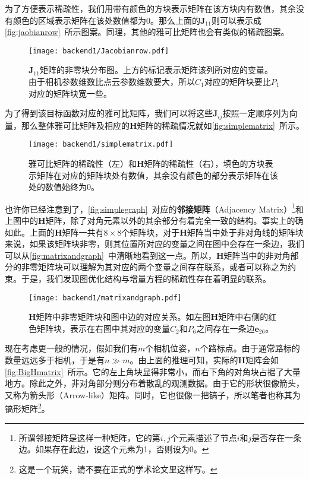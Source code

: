 为了方便表示稀疏性，我们用带有颜色的方块表示矩阵在该方块内有数值，其余没有颜色的区域表示矩阵在该处数值都为0。那么上面的$\bm{J}_{11}$则可以表示成\autoref{fig:jaobianrow}~所示图案。同理，其他的雅可比矩阵也会有类似的稀疏图案。

\begin{figure}[!t]
	\centering
	\texttt{[image: backend1/Jacobianrow.pdf]}
	\caption{$\bm{J}_{11}$矩阵的非零块分布图。上方的标记表示矩阵该列所对应的变量。由于相机参数维数比点云参数维数要大，所以$C_1$对应的矩阵块要比$P_1$对应的矩阵块宽一些。}
	\label{fig:jaobianrow}
\end{figure}

为了得到该目标函数对应的雅可比矩阵，我们可以将这些$\bm{J}_{ij}$按照一定顺序列为向量，那么整体雅可比矩阵及相应的$\bm{H}$矩阵的稀疏情况就如\autoref{fig:simplematrix}~所示。

\begin{figure}[!t]
	\centering
	\texttt{[image: backend1/simplematrix.pdf]}
	\caption{雅可比矩阵的稀疏性（左）和$\bm{H}$矩阵的稀疏性（右），填色的方块表示矩阵在对应的矩阵块处有数值，其余没有颜色的部分表示矩阵在该处的数值始终为0。}
	\label{fig:simplematrix}
\end{figure}

也许你已经注意到了，\autoref{fig:simplegraph}~对应的\textbf{邻接矩阵}（Adjacency Matrix）\footnote{所谓邻接矩阵是这样一种矩阵，它的第$i,j$个元素描述了节点$i$和$j$是否存在一条边。如果存在此边，设这个元素为1，否则设为0。}和上图中的$\bm{H}$矩阵，除了对角元素以外的其余部分有着完全一致的结构。事实上的确如此。上面的$\bm{H}$矩阵一共有$8 \times 8$个矩阵块，对于$\bm{H}$矩阵当中处于非对角线的矩阵块来说，如果该矩阵块非零，则其位置所对应的变量之间在图中会存在一条边，我们可以从\autoref{fig:matrixandgraph}~中清晰地看到这一点。所以，$\bm{H}$矩阵当中的非对角部分的非零矩阵块可以理解为其对应的两个变量之间存在联系，或者可以称之为约束。于是，我们发现图优化结构与增量方程的稀疏性存在着明显的联系。

\begin{figure}[!htp]
	\centering
	\texttt{[image: backend1/matrixandgraph.pdf]}
	\caption{$\bm{H}$矩阵中非零矩阵块和图中边的对应关系。如左图$\bm{H}$矩阵中右侧的红色矩阵块，表示在右图中其对应的变量$C_2$和$P_6$之间存在一条边$\bm{e}_{26}$。}
	\label{fig:matrixandgraph}
\end{figure}

现在考虑更一般的情况，假如我们有$m$个相机位姿，$n$个路标点。由于通常路标的数量远远多于相机，于是有$n \gg m$。由上面的推理可知，实际的$\bm{H}$矩阵会如\autoref{fig:BigHmatrix}~所示。它的左上角块显得非常小，而右下角的对角块占据了大量地方。除此之外，非对角部分则分布着散乱的观测数据。由于它的形状很像箭头，又称为箭头形（Arrow-like）矩阵\textsuperscript{\cite{Barfoot2016}}。同时，它也很像一把镐子，所以笔者也称其为镐形矩阵\footnote{这是一个玩笑，请不要在正式的学术论文里这样写。}。

